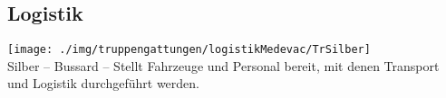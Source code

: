 \subsection{Logistik}
\texttt{[image: ./img/truppengattungen/logistikMedevac/TrSilber]}\\
Silber -- Bussard -- Stellt Fahrzeuge und Personal bereit, mit denen Transport und Logistik durchgeführt werden.